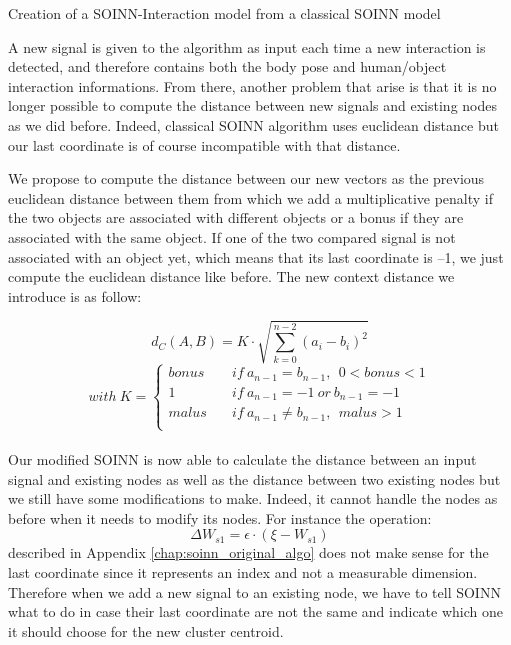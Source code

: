 \begin{algorithm}
    \caption{Creation of a SOINN-Interaction model from a classical SOINN model}
    \label{algo:new_nodes}
\end{algorithm}

A new signal is given to the algorithm as input each time a new interaction is detected, and therefore contains both the body pose and human/object interaction informations. From there, another problem that arise is that it is no longer possible to compute the distance between new signals and existing nodes as we did before. Indeed, classical SOINN algorithm uses euclidean distance but our last coordinate is of course incompatible with that distance. 

We propose to compute the distance between our new vectors as the previous euclidean distance between them from which we add a multiplicative penalty if the two objects are associated with different objects or a bonus if they are associated with the same object. If one of the two compared signal is not associated with an object yet, which means that its last coordinate is --1, we just compute the euclidean distance like before. The new context distance we introduce is as follow:

\begin{equation}
    d_C(A, B) = K\cdot \sqrt{\sum_{k=0}^{n-2}(a_i-b_i)^2} 
\end{equation}
\[
with~K =
\begin{cases}
    bonus &\quad if~a_{n-1}=b_{n-1},~~ 0 < bonus < 1 \\
    1 &\quad if~a_{n-1}=-1~or~b_{n-1}=-1 \\
    malus &\quad if~a_{n-1}\neq b_{n-1},~~ malus > 1 \\
\end{cases} 
\]
\\
Our modified SOINN is now able to calculate the distance between an input signal and existing nodes as well as the distance between two existing nodes but we still have some modifications to make. Indeed, it cannot handle the nodes as before when it needs to modify its nodes. For instance the operation:
\begin{equation}
    \Delta W_{s1} = \epsilon \cdot (\xi - W_{s1})
\end{equation}
described in Appendix \ref{chap:soinn_original_algo} does not make sense for the last coordinate since it represents an index and not a measurable dimension. Therefore when we add a new signal to an existing node, we have to tell SOINN what to do in case their last coordinate are not the same and indicate which one it should choose for the new cluster centroid. 

